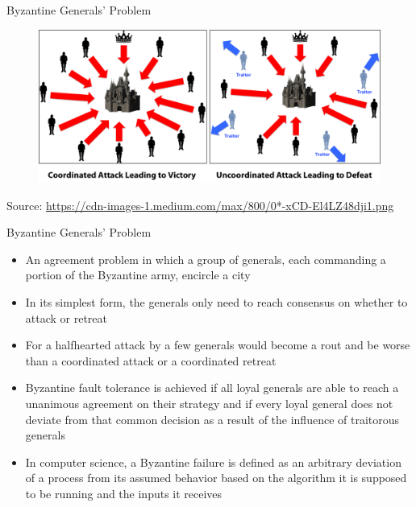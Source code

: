 \documentclass[11pt]{beamer}
\begin{document}

\begin{frame}{Byzantine Generals' Problem}
	\begin{figure}[]
		\centering
		\includegraphics  [width=4.in]{Images/byzantine}
	\end{figure}
	\begin{tiny}
		Source: \href{https://cdn-images-1.medium.com/max/800/0*-xCD-El4LZ48dji1.png}{https://cdn-images-1.medium.com/max/800/0*-xCD-El4LZ48dji1.png}
	\end{tiny}
\end{frame}



\begin{frame}{Byzantine Generals' Problem}
	\begin{itemize}
		\item An agreement problem in which a group of generals, each commanding a portion of the Byzantine army, encircle a city
		\item In its simplest form, the generals only need to reach consensus on whether to attack or retreat
		\item For a halfhearted attack by a few generals would become a rout and be worse than a coordinated attack or a coordinated retreat
		\item Byzantine fault tolerance is achieved if all loyal generals are able to reach a unanimous agreement on their strategy and if every loyal general does not deviate from that common decision as a result of the influence of traitorous generals
		\item In computer science, a Byzantine failure is defined as an arbitrary deviation of a process from its assumed behavior based on the algorithm it is supposed to be running and the inputs it receives
	\end{itemize}
\end{frame}


\end{document}
